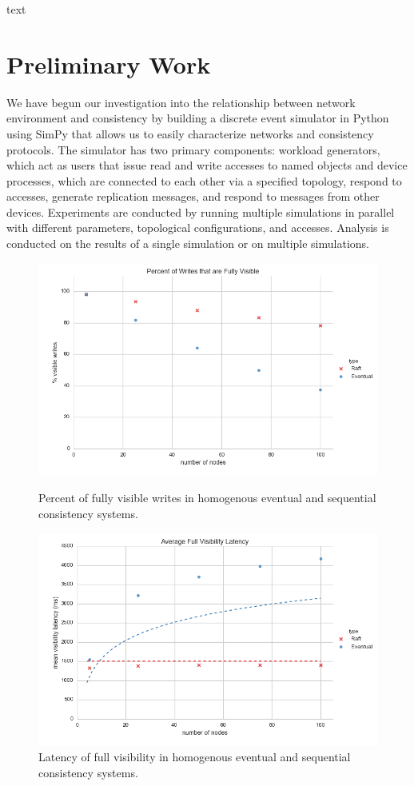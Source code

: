 \documentclass{article}
\begin{document}
text

\section{Preliminary Work}

We have begun our investigation into the relationship between network environment and consistency by building a discrete event simulator in Python using SimPy that allows us to easily characterize networks and consistency protocols. The simulator has two primary components: workload generators, which act as users that issue read and write accesses to named objects and device processes, which are connected to each other via a specified topology, respond to accesses, generate replication messages, and respond to messages from other devices. Experiments are conducted by running multiple simulations in parallel with different parameters, topological configurations, and accesses. Analysis is conducted on the results of a single simulation or on multiple simulations.

\begin{figure}
    \centering
      \includegraphics[width=\linewidth]{figures/scaling/visible_writes}
      \caption{Percent of fully visible writes in homogenous eventual and sequential consistency systems.}
      \label{fig:scaling_visible_writes}
    \endminipage\hfill
      \includegraphics[width=\linewidth]{figures/scaling/visibility_latency}
      \caption{Latency of full visibility in homogenous eventual and sequential consistency systems.}
      \label{fig:scaling_visibility_latency}
    \endminipage
\end{figure}
\end{document}
